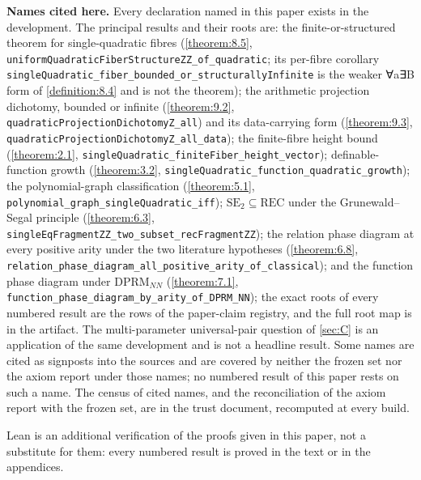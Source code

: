 \textbf{Names cited here.} Every declaration named in this paper exists in the development. The principal results and their roots are: the finite-or-structured theorem for single-quadratic fibres (\cref{theorem:8.5}, \texttt{uniformQuadratic\allowbreak{}FiberStructureZZ\_\allowbreak{}of\_\allowbreak{}quadratic}; its per-fibre corollary \texttt{singleQuadratic\_\allowbreak{}fiber\_\allowbreak{}bounded\_\allowbreak{}or\_\allowbreak{}structurallyInfinite} is the weaker ∀a∃B form of \cref{definition:8.4} and is not the theorem); the arithmetic projection dichotomy, bounded or infinite (\cref{theorem:9.2}, \texttt{quadraticProjectionDichotomyZ\_\allowbreak{}all}) and its data-carrying form (\cref{theorem:9.3}, \texttt{quadraticProjectionDichotomyZ\_\allowbreak{}all\_\allowbreak{}data}); the finite-fibre height bound (\cref{theorem:2.1}, \texttt{singleQuadratic\_\allowbreak{}finiteFiber\_\allowbreak{}height\_\allowbreak{}vector}); definable-function growth (\cref{theorem:3.2}, \texttt{singleQuadratic\_\allowbreak{}function\_\allowbreak{}quadratic\_\allowbreak{}growth}); the polynomial-graph classification (\cref{theorem:5.1}, \texttt{polynomial\_\allowbreak{}graph\_\allowbreak{}singleQuadratic\_\allowbreak{}iff}); $\mathrm{SE}_{2} ⊆ \mathrm{REC}$ under the Grunewald–Segal principle (\cref{theorem:6.3}, \texttt{singleEqFragmentZZ\_\allowbreak{}two\_\allowbreak{}subset\_\allowbreak{}recFragmentZZ}); the relation phase diagram at every positive arity under the two literature hypotheses (\cref{theorem:6.8}, \texttt{relation\_\allowbreak{}phase\_\allowbreak{}diagram\_\allowbreak{}all\_\allowbreak{}positive\_\allowbreak{}arity\_\allowbreak{}of\_\allowbreak{}classical}); and the function phase diagram under $\mathrm{DPRM}_{NN}$ (\cref{theorem:7.1}, \texttt{function\_\allowbreak{}phase\_\allowbreak{}diagram\_\allowbreak{}by\_\allowbreak{}arity\_\allowbreak{}of\_\allowbreak{}DPRM\_\allowbreak{}NN}); the exact roots of every numbered result are the rows of the paper-claim registry, and the full root map is in the artifact. The multi-parameter universal-pair question of \cref{sec:C} is an application of the same development and is not a headline result. Some names are cited as signposts into the sources and are covered by neither the frozen set nor the axiom report under those names; no numbered result of this paper rests on such a name. The census of cited names, and the reconciliation of the axiom report with the frozen set, are in the trust document, recomputed at every build.

Lean is an additional verification of the proofs given in this paper, not a substitute for them: every numbered result is proved in the text or in the appendices.

